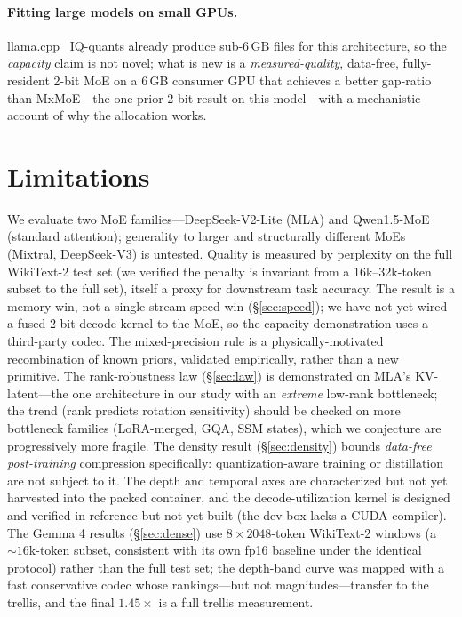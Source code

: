 \documentclass[10pt]{article}
\begin{document}
\paragraph{Fitting large models on small GPUs.}
llama.cpp~\cite{llamacpp} IQ-quants already produce sub-6\,GB files for this architecture, so the
\emph{capacity} claim is not novel; what is new is a \emph{measured-quality}, data-free, fully-resident
2-bit MoE on a 6\,GB consumer GPU that achieves a better gap-ratio than MxMoE---the one prior 2-bit result on this model---with
a mechanistic account of why the allocation works.

\section{Limitations}\label{sec:limits}
We evaluate two MoE families---DeepSeek-V2-Lite (MLA) and Qwen1.5-MoE (standard attention); generality to
larger and structurally different MoEs (Mixtral, DeepSeek-V3) is untested. Quality is measured by
perplexity on the full WikiText-2 test set (we verified the penalty is invariant from a 16k--32k-token
subset to the full set), itself a proxy for downstream
task accuracy. The result is a memory win, not a single-stream-speed
win (\S\ref{sec:speed}); we have not yet wired a fused 2-bit decode kernel to the MoE, so the capacity
demonstration uses a third-party codec. The mixed-precision rule is a physically-motivated
recombination of known priors, validated empirically, rather than a new primitive. The rank-robustness law
(\S\ref{sec:law}) is demonstrated on MLA's KV-latent---the one architecture in our study with an
\emph{extreme} low-rank bottleneck; the trend (rank predicts rotation sensitivity) should be checked on more
bottleneck families (LoRA-merged, GQA, SSM states), which we conjecture are progressively more fragile. The
density result (\S\ref{sec:density}) bounds \emph{data-free post-training} compression specifically:
quantization-aware training or distillation are not subject to it. The depth and temporal axes are
characterized but not yet harvested into the packed container, and the decode-utilization kernel is designed
and verified in reference but not yet built (the dev box lacks a CUDA compiler). The Gemma 4 results
(\S\ref{sec:dense}) use $8\times2048$-token WikiText-2 windows (a ${\sim}16$k-token subset, consistent with
its own fp16 baseline under the identical protocol) rather than the full test set; the depth-band curve was
mapped with a fast conservative codec whose rankings---but not magnitudes---transfer to the trellis, and the
final $1.45\times$ is a full trellis measurement.
\end{document}
